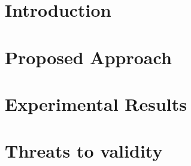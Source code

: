 \documentclass{sig-alternate-05-2015}
\begin{document}
\maketitle\begin{abstract}
	\label{sec:abstract}
	
\end{abstract}

\printccsdesc
{}

\section{Introduction}
\label{sec:introduction}




\section{Proposed Approach}
\label{sec:framework}


\section{Experimental Results}
\label{sec:exp_results}


\section{Threats to validity}
\label{sec:threats}

\end{document}
